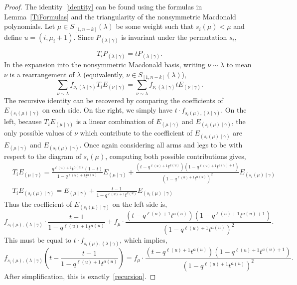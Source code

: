 \documentclass[11pt]{article}
\theoremstyle{definition}
\numberwithin{equation}{section}
\newcommand{\PP}{P_{(\lambda \mid \gamma)}}
\newcommand{\nudom}{{( \lambda \mid \gamma )}}
\newcommand{\lambdagamma}{{\nudom}}
\newcommand{\nugamma}{{(\nu \mid \gamma)}}
\newcommand{\mugamma}{{(\mu \mid \gamma)}}
\newcommand{\fnuu}{f_{\nu,\lambdagamma}}
\begin{document}
\begin{proof}
The identity~\eqref{identity} can be found using the formulas in Lemma~\ref{TiFormulas} and the triangularity of the nonsymmetric Macdonald polynomials. Let $\mu \in S_{[1,n-k]}(\lambda)$ be some weight such that $s_i(\mu)<\mu$ and define $u=(i,\mu_{i}+1)$. Since $\PP$ is invariant under the permutation $s_i$,

\[ T_i \PP = t \PP.\]
In the expansion into the nonsymmetric Macdonald basis, writing $\nu \sim \lambda$ to mean $\nu$ is a rearrangement of $\lambda$ (equivalently, $\nu \in S_{[1,n-k]}(\lambda)$),
\[ \sum_{\nu \sim \lambda} \fnuu T_i E_{\nugamma} = \sum_{\nu \sim \lambda} \fnuu t E_{\nugamma}.   \]
The recursive identity can be recovered by comparing the coefficients of $E_{(s_i(\mu) \mid \gamma)}$ on each side. On the right, we simply have $t\cdot f_{s_i(\mu),\lambdagamma}$. On the left, because $T_i E_{(\mu \mid \gamma)}$ is a linear combination of $E_{(\mu \mid \gamma)}$ and $E_{(s_i(\mu) \mid \gamma)}$, the only possible values of $\nu$ which contribute to the coefficient of $E_{(s_i(\mu) \mid \gamma)}$ are $E_\mugamma$ and $E_{(s_i(\mu) \mid \gamma)}$. Once again considering all arms and legs to be with respect to the diagram of $s_i(\mu)$, computing both possible contributions gives,
\begin{align*}
     &T_i E_{\mugamma} =  \frac{q^{\ell(u)+1}t^{a(u)}(1-t)}{1-q^{\ell(u)+1}t^{a(u)}} E_{\mugamma} +  \frac{(t-q^{\ell(u)+1}t^{a(u)})(1-q^{\ell(u)+1}t^{a(u)+1})}{(1-q^{\ell(u)+1}t^{a(u)})^2} E_{(s_i(\mu) \mid \gamma)}\\
    &T_i E_{(s_i(\mu)\mid \gamma)} =  E_{\mugamma} +  \frac{t-1}{1-q^{\ell(u)+1}t^{a(u)}} E_{(s_i(\mu)\mid \gamma)}
\end{align*}
Thus the coefficient of $E_{(s_i(\mu)\mid \gamma)}$ on the left side is,
\[ f_{s_i(\mu),\lambdagamma} \cdot \frac{t-1}{1-q^{\ell(u)+1}t^{a(u)}} + f_\mu  \cdot \frac{(t-q^{\ell(u)+1}t^{a(u)})(1-q^{\ell(u)+1}t^{a(u)+1})}{(1-q^{\ell(u)+1}t^{a(u)})^2}.\]
This must be equal to $t\cdot f_{s_i(\mu),\lambdagamma}$, which implies,
\[ f_{s_i(\mu),\lambdagamma} \left( t-\frac{t-1}{1-q^{\ell(u)+1}t^{a(u)}} \right) = f_\mu  \cdot \frac{(t-q^{\ell(u)+1}t^{a(u)})(1-q^{\ell(u)+1}t^{a(u)+1})}{(1-q^{\ell(u)+1}t^{a(u)})^2}.\]
After simplification, this is exactly~\eqref{recursion}.
\end{proof}
\end{document}
